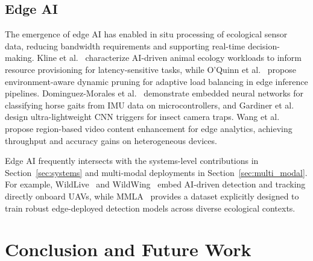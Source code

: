 \documentclass[letterpaper,twocolumn,10pt]{article}
\begin{document}
\subsection{Edge AI}
\label{sec:edge_ai}
The emergence of edge AI has enabled in situ processing of ecological sensor data, reducing bandwidth requirements and supporting real-time decision-making. Kline et al.~\cite{kline2024characterizing} characterize AI-driven animal ecology workloads to inform resource provisioning for latency-sensitive tasks, while O’Quinn et al.~\cite{oquinn2025environment} propose environment-aware dynamic pruning for adaptive load balancing in edge inference pipelines. Dominguez-Morales et al.~\cite{dominguez2021wildlife} demonstrate embedded neural networks for classifying horse gaits from IMU data on microcontrollers, and Gardiner et al.~\cite{gardiner2025towards} design ultra-lightweight CNN triggers for insect camera traps. Wang et al.~\cite{wang2025regionbased} propose region-based video content enhancement for edge analytics, achieving throughput and accuracy gains on heterogeneous devices.  

Edge AI frequently intersects with the systems-level contributions in Section~\ref{sec:systems} and multi-modal deployments in Section~\ref{sec:multi_modal}. For example, WildLive~\cite{nguyen2025wildlive} and WildWing~\cite{kline2025wildwing} embed AI-driven detection and tracking directly onboard UAVs, while MMLA~\cite{kline2025mmla} provides a dataset explicitly designed to train robust edge-deployed detection models across diverse ecological contexts.


\section{Conclusion and Future Work}



\end{document}
